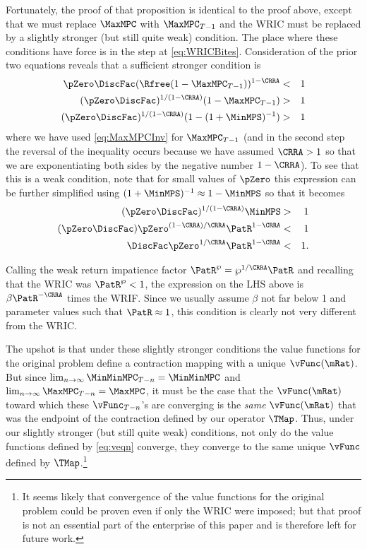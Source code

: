 \documentclass[titlepage]{\econtex}\providecommand{\texname}{BufferStockTheory}
\begin{document}
Fortunately, the proof of that proposition is identical to the proof above, except that we must replace
$\MaxMPC$ with $\MaxMPC_{T-1}$ and the WRIC must be
replaced by a slightly stronger (but still quite weak) condition.  The place where these
conditions have force is in the step at \eqref{eq:WRICBites}.
Consideration of the prior two equations reveals that
a sufficient stronger condition is
\begin{eqnarray*}
    \pZero \DiscFac (\Rfree (1-\MaxMPC_{T-1}))^{1-\CRRA} & < & 1
\\  (\pZero \DiscFac)^{1/(1-\CRRA)}  (1-\MaxMPC_{T-1}) & > & 1
\\  (\pZero \DiscFac)^{1/(1-\CRRA)}  (1-(1+\MinMPS)^{-1}) & > & 1
\end{eqnarray*}
where we have used \eqref{eq:MaxMPCInv} for $\MaxMPC_{T-1}$ (and in the second step the reversal of the inequality occurs because we have assumed $\CRRA > 1$ so that we are exponentiating both sides by the negative number $1-\CRRA$).  To see that this is a weak condition, note that for small values of
$\pZero$ this expression can be further simplified using $(1+\MinMPS)^{-1}
\approx 1-\MinMPS$ so that it becomes
\begin{eqnarray*}
  (\pZero \DiscFac)^{1/(1-\CRRA)}  \MinMPS & > & 1
\\  (\pZero \DiscFac)  \pZero^{(1-\CRRA)/\CRRA} \PatR^{1-\CRRA} & < & 1
\\  \DiscFac  \pZero^{1/\CRRA} \PatR^{1-\CRRA} & < & 1.
\end{eqnarray*}

Calling the weak return impatience factor $\PatR^{\wp}=\wp^{1/\CRRA}\PatR$ and
recalling that the WRIC was $\PatR^{\wp}<1$, the expression on the LHS
above is $\beta \PatR^{-\CRRA}$ times the WRIF.  Since we usually assume $\beta$ not far below 1 and
parameter values such that $\PatR \approx 1$, this condition is clearly not very
different from the WRIC.

The upshot is that under these slightly stronger conditions the value
functions for the original problem define a contraction mapping with a
unique $\vFunc(\mRat)$.  But since $\lim_{n \rightarrow \infty}
\MinMinMPC_{T-n} = \MinMinMPC$ and $\lim_{n \rightarrow \infty}
\MaxMPC_{T-n} = \MaxMPC$, it must be the case that the $\vFunc(\mRat)$
toward which these $\vFunc_{T-n}$'s are converging is the {\it same}
$\vFunc(\mRat)$ that was the endpoint of the contraction defined by
our operator $\TMap$.  Thus, under our slightly stronger (but still
quite weak) conditions, not only do the value functions defined by
\eqref{eq:veqn} converge, they converge to the same unique $\vFunc$
defined by $\TMap$.\footnote{It seems likely that convergence of the
  value functions for the original problem could be proven even if
  only the WRIC were imposed; but that proof is not an essential part
  of the enterprise of this paper and is therefore left for future
  work.}
\end{document}
